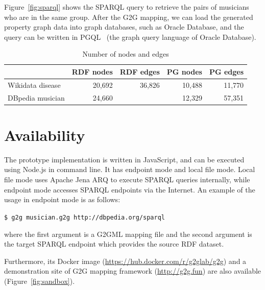 \documentclass[runningheads]{llncs}
\begin{document}
Figure~\ref{fig:sparql} shows the SPARQL query to retrieve the pairs of musicians who are in the same group. After the G2G mapping, we can load the generated property graph data into graph databases, such as Oracle Database, and the query can be written in PGQL~\cite{pgql} (the graph query language of Oracle Database).

\begin{table}[h]
    \centering
    \begin{tabular}{l|r|r|r|r}
        \hline
        & RDF nodes & RDF edges & PG nodes & PG edges \\
        \hline
        Wikidata disease & 20,692 & 36,826 & 10,488 & 11,770 \\
        DBpedia musician & 24,660 &  & 12,329 & 57,351 \\
        \hline
    \end{tabular}
    \caption{Number of nodes and edges}
    \label{tab:my_label}
\end{table}


\section{Availability}
The prototype implementation is written in JavaScript, and can be executed using Node.js in command line. It has endpoint mode and local file mode. Local file mode uses Apache Jena ARQ to execute SPARQL queries internally, while endpoint mode accesses SPARQL endpoints via the Internet. An example of the usage in endpoint mode is as follows:

\texttt{\$ g2g musician.g2g http://dbpedia.org/sparql}

\noindent where the first argument is a G2GML mapping file and the second argument is the target SPARQL endpoint which provides the source RDF dataset. %

Furthermore, its Docker image (\url{https://hub.docker.com/r/g2glab/g2g}) and a demonstration site of G2G mapping framework (\url{http://g2g.fun}) are also available (Figure~\ref{fig:sandbox}).
\end{document}

